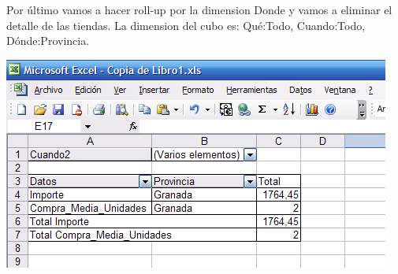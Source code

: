 \documentclass[paper=a4, fontsize=11pt, spanish]{scrartcl}
\numberwithin{equation}{section} %
\numberwithin{figure}{section} %
\numberwithin{table}{section} %
\begin{document}
Por último vamos a hacer roll-up por la dimension Donde y vamos a eliminar el detalle de las tiendas.
La dimension del cubo es: Qué:Todo, Cuando:Todo, Dónde:Provincia.

\begin{center}
	\includegraphics[scale=0.75]{rollup.png}
\end{center}
	
\end{document}
